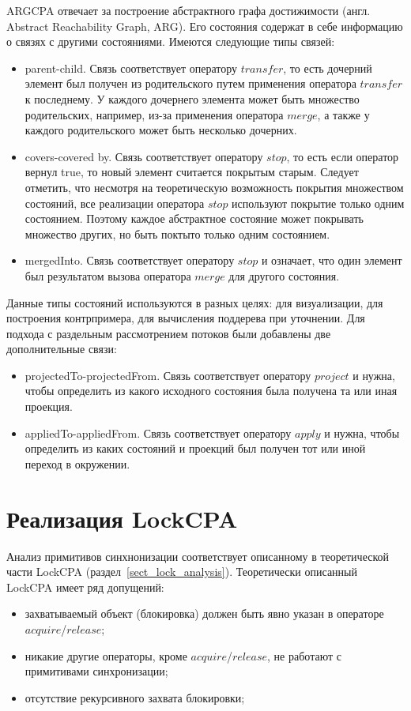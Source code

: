 ARGCPA отвечает за построение абстрактного графа достижимости (англ. Abstract Reachability Graph, ARG). 
Его состояния содержат в себе информацию о связях с другими состояниями.
Имеются следующие типы связей:
\begin{itemize}
\item parent-child. Связь соответствует оператору $transfer$, то есть дочерний элемент был получен из родительского путем применения оператора $transfer$ к последнему. 
У каждого дочернего элемента может быть множество родительских, например, из-за применения оператора $merge$, а также у каждого родительского может быть несколько дочерних.
\item covers-covered by. Связь соответствует оператору $stop$, то есть если оператор вернул true, то новый элемент считается покрытым старым. 
Следует отметить, что несмотря на теоретическую возможность покрытия множеством состояний, все реализации оператора $stop$ используют покрытие только одним состоянием.
Поэтому каждое абстрактное состояние может покрывать множество других, но быть поктыто только одним состоянием.
\item mergedInto.  Связь соответствует оператору $stop$ и означает, что один элемент был результатом вызова оператора $merge$ для другого состояния.
\end{itemize}

Данные типы состояний используются в разных целях: для визуализации, для построения контрпримера, для вычисления поддерева при уточнении.
Для подхода с раздельным рассмотрением потоков были добавлены две дополнительные связи:
\begin{itemize}
\item projectedTo-projectedFrom. Связь соответствует оператору $project$ и нужна, чтобы определить из какого исходного состояния была получена та или иная проекция.
\item appliedTo-appliedFrom. Связь соответствует оператору $apply$ и нужна, чтобы определить из каких состояний и проекций был получен тот или иной переход в окружении.
\end{itemize}

\section{Реализация LockCPA}
\label{sect_impl_lock}
Анализ примитивов синхнонизации соответствует описанному в теоретической части LockCPA (раздел~\ref{sect_lock_analysis}).
Теоретически описанный LockCPA имеет ряд допущений:
\begin{itemize}
\item захватываемый объект (блокировка) должен быть явно указан в операторе $acquire$/$release$;
\item никакие другие операторы, кроме $acquire$/$release$, не работают с примитивами синхронизации;
\item отсутствие рекурсивного захвата блокировки;
\end{itemize}

